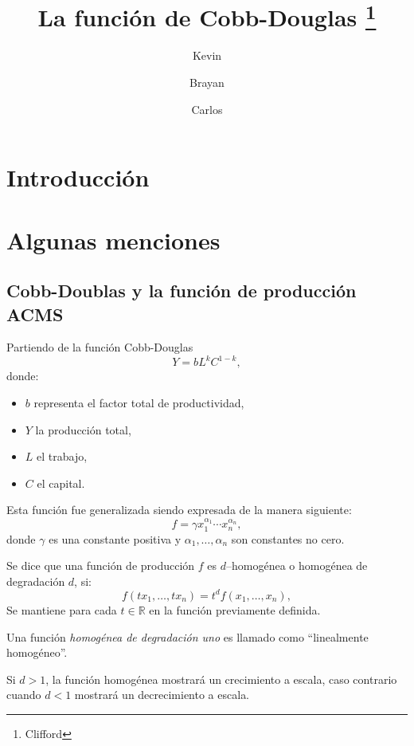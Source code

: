 \documentclass[
    a4paper,%
    11pt, %
    fleqn %
]{article}
\title{
    La función de Cobb-Douglas
    \thanks{Clifford}
}
\author{
    Kevin\and
    Brayan\and
    Carlos
}
\begin{document}
\maketitle

\section{Introducción}
\section{Algunas menciones}

\subsection{Cobb-Doublas y la función de producción ACMS}

Partiendo de la función Cobb-Douglas
\begin{equation}\label{eq:1}
Y = bL^{k}C^{1-k},
\end{equation}
donde:
\begin{itemize}
    \item $b$ representa el factor total de productividad,
    \item $Y$ la producción total,
    \item $L$ el trabajo,
    \item $C$ el capital.
\end{itemize}
Esta función fue generalizada siendo expresada de la manera siguiente:
\begin{equation}\label{eq:2}
f = \gamma{x}_{1}^{\alpha_{1}}\cdots x_{n}^{\alpha_{n}},
\end{equation}
donde $\gamma$ es una constante positiva y $\alpha_{1},\ldots,\alpha_{n}$ son constantes no cero.

Se dice que una función de producción $f$ es $d$--homogénea o homogénea de degradación $d$, si:
\begin{equation}\label{eq:3}
f\left(tx_{1},\ldots,tx_{n}\right) = t^{d}f\left(x_{1},\ldots,x_{n}\right),
\end{equation}
Se mantiene para cada $t\in\mathbb{R}$ en la función previamente definida.

Una función \emph{homogénea de degradación uno} es llamado como ``linealmente homogéneo''.

Si $d>1$, la función homogénea mostrará un crecimiento a escala, caso contrario cuando $d<1$ mostrará un decrecimiento a escala.
\end{document}
